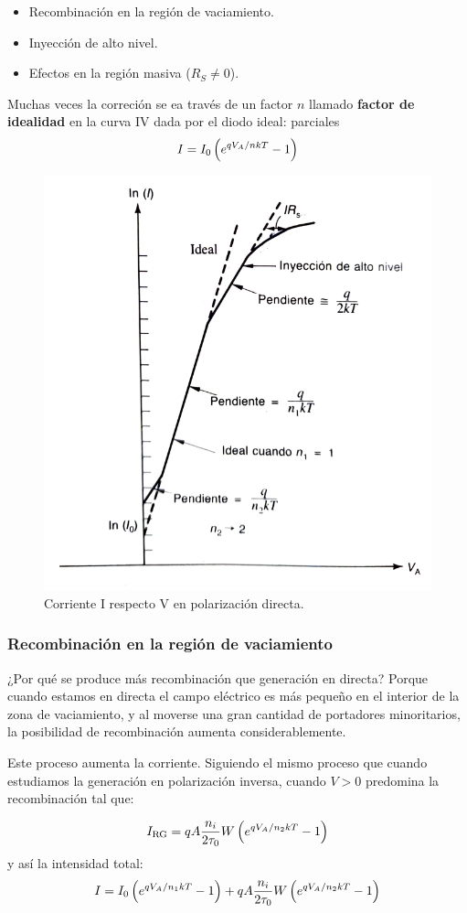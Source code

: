 \begin{itemize}
    \item Recombinación en la región de vaciamiento.
    \item Inyección de alto nivel.
    \item Efectos en la región masiva ($R_S\neq 0$).
\end{itemize}
Muchas veces la correción se ea través de un factor $n$ llamado \textbf{factor de idealidad} en la curva IV dada por el diodo ideal: 
parciales
\begin{equation}
    I = I_0 \left( e^{qV_A/nkT}-1 \right)
\end{equation}
\begin{figure}[h!] \centering
    \includegraphics[width=0.5\linewidth]{Cuerpo/Ch_03/03_Temario_11.png}
    \caption{Corriente I respecto V en polarización directa.}
\end{figure}


\subsubsection{Recombinación en la región de vaciamiento}
¿Por qué se produce más recombinación que generación en directa? Porque cuando estamos en directa el campo eléctrico es más pequeño en el interior de la zona de vaciamiento, y al moverse una gran cantidad de portadores minoritarios, la posibilidad de recombinación aumenta considerablemente. 

Este proceso aumenta la corriente. Siguiendo el mismo proceso que cuando estudiamos la generación en polarización inversa, cuando $V>0$ predomina la recombinación tal que: 

\begin{equation}
    I_{\text{RG}} = q A \frac{n_i}{2\tau_0} W \left( e^{qV_A/n_2kT}-1 \right)
\end{equation}
y así la intensidad total: 
\begin{equation}
    I = I_0 \left( e^{qV_A/n_1kT}-1 \right) +q A \frac{n_i}{2\tau_0} W \left( e^{qV_A/n_2kT}-1 \right)
\end{equation}

